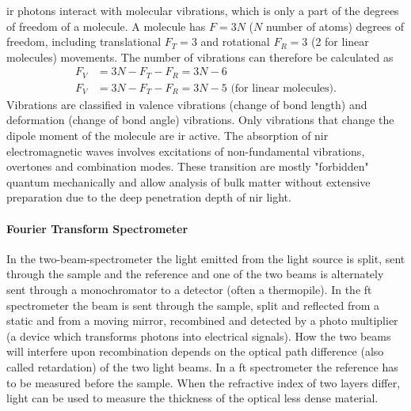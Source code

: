 \Gls{ir} photons interact with molecular vibrations, which is only a part of the degrees of freedom of a molecule.
A molecule has $F=3N$ ($N$ number of atoms) degrees of freedom, including translational $F_T=3$ and rotational $F_R=3$ (2 for linear molecules) movements. 
%
The number of vibrations can therefore be calculated as 
\begin{align*}
	F_V &= 3N - F_T - F_R = 3N - 6 \\
	F_V &= 3N - F_T - F_R = 3N - 5 \textrm{ (for linear molecules)}.
\end{align*}
Vibrations are classified in valence vibrations (change of bond length) and deformation (change of bond angle) vibrations\cite{Melker2006}. 
Only vibrations that change the dipole moment of the molecule are \gls{ir} active. 
The absorption of \Gls{nir} electromagnetic waves involves excitations of non-fundamental vibrations, overtones and combination modes. 
These transition are mostly "forbidden" quantum mechanically and allow analysis of bulk matter without extensive preparation
due to the deep penetration depth of \gls{nir} light\cite{bec2019breakthrough}.


\paragraph{Fourier Transform Spectrometer}
In the two-beam-spectrometer the light emitted from the light source is split, 
sent through the sample and the reference and one of the two beams is alternately 
sent through a monochromator to a detector (often a thermopile).
%
In the \gls{ft} spectrometer the beam is sent through the sample, split and 
reflected from a static and from a moving mirror, recombined and detected by a photo 
multiplier (a device which transforms photons into electrical signals). 
How the two beams will interfere upon recombination depends on the optical path difference (also called retardation) of the two light beams\cite{Schwedt2008}.
In a \gls{ft} spectrometer the reference has to be measured before the sample.
%
When the refractive index of two layers differ, light can be used to measure the thickness\cite{Dumin1967} of the optical less dense material.


